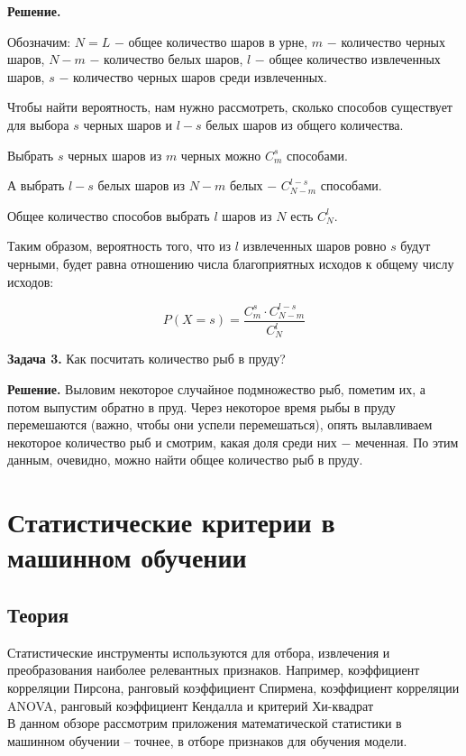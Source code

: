 \textbf{Решение.}

Обозначим:
$N = L$ $-$ общее количество шаров в урне,
$m$ $-$ количество черных шаров,
$N - m$ $-$ количество белых шаров,
$l$ $-$ общее количество извлеченных шаров,
$s$ $-$ количество черных шаров среди извлеченных.

Чтобы найти вероятность, нам нужно рассмотреть, сколько способов существует для выбора $s$ черных шаров и $l - s$ белых шаров из общего количества.

Выбрать $s$ черных шаров из $m$ черных можно $C_m^s$ способами.

А выбрать $l - s$ белых шаров из $N - m$ белых $-$ $ C_{N - m}^{l - s}$ способами.

Общее количество способов выбрать $l$ шаров из $N$ есть $C_N^l$.

Таким образом, вероятность того, что из $l$ извлеченных шаров ровно $s$ будут черными, будет равна отношению числа благоприятных исходов к общему числу исходов:

$$
    P(X = s) = \frac{C_{m}^{s} \cdot C_{N - m}^{l - s}}{C_{N}^{l}}
$$

\textbf{Задача 3.} Как посчитать количество рыб в пруду?

\textbf{Решение.} Выловим некоторое случайное подмножество рыб, пометим их, а потом выпустим обратно в пруд. Через некоторое время рыбы в пруду перемешаются (важно, чтобы они успели перемешаться), опять вылавливаем некоторое количество рыб и смотрим, какая доля среди них $-$ меченная. По этим данным, очевидно, можно найти общее количество рыб в пруду.


\section{Статистические критерии в машинном обучении}
\subsection{Теория}

Статистические инструменты используются для отбора, извлечения и преобразования наиболее релевантных признаков. Например, коэффициент корреляции Пирсона, ранговый коэффициент Спирмена, коэффициент корреляции ANOVA, ранговый коэффициент Кендалла и критерий  Хи-квадрат \\

В данном обзоре рассмотрим приложения математической статистики в машинном обучении – точнее, в отборе признаков для обучения модели.  \\

